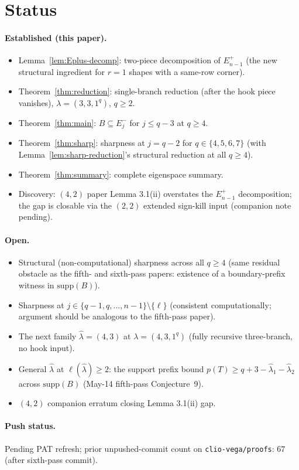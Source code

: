 \documentclass[11pt]{article}
\theoremstyle{definition}
\newcommand{\hatl}{\widehat\lambda}
\newcommand{\supp}{\mathrm{supp}}
\begin{document}
\section{Status}\label{sec:status}

\paragraph{Established (this paper).}
\begin{itemize}[topsep=0.3em,itemsep=0.1em]
\item Lemma~\ref{lem:Eplus-decomp}: two-piece decomposition of
   $E_{n-1}^+$ (the new structural ingredient for $r = 1$ shapes
   with a same-row corner).
\item Theorem~\ref{thm:reduction}: single-branch reduction (after the
   hook piece vanishes), $\lambda = (3, 3, 1^q)$, $q \ge 2$.
\item Theorem~\ref{thm:main}: $B \subseteq E_j^-$ for $j \le q - 3$
   at $q \ge 4$.
\item Theorem~\ref{thm:sharp}: sharpness at $j = q - 2$ for $q \in
   \{4, 5, 6, 7\}$ (with Lemma~\ref{lem:sharp-reduction}'s structural
   reduction at all $q \ge 4$).
\item Theorem~\ref{thm:summary}: complete eigenspace summary.
\item Discovery: $(4, 2)$ paper Lemma 3.1(ii) overstates the
   $E_{n-1}^+$ decomposition; the gap is closable via the $(2, 2)$
   extended sign-kill input (companion note pending).
\end{itemize}

\paragraph{Open.}
\begin{itemize}[topsep=0.3em,itemsep=0.1em]
\item Structural (non-computational) sharpness across all $q \ge 4$
   (same residual obstacle as the fifth- and sixth-pass papers:
   existence of a boundary-prefix witness in $\supp(B)$).
\item Sharpness at $j \in \{q-1, q, \ldots, n-1\} \setminus \{\ell\}$
   (consistent computationally; argument should be analogous to the
   fifth-pass paper).
\item The next family $\hatl = (4, 3)$ at $\lambda = (4, 3, 1^q)$
   (fully recursive three-branch, no hook input).
\item General $\hatl$ at $\ell(\hatl) \ge 2$: the support prefix bound
   $p(T) \ge q + 3 - \hatl_1 - \hatl_2$ across $\supp(B)$
   (May-14 fifth-pass Conjecture~9).
\item $(4, 2)$ companion erratum closing Lemma 3.1(ii) gap.
\end{itemize}

\paragraph{Push status.}
Pending PAT refresh; prior unpushed-commit count on
\texttt{clio-vega/proofs}: $67$ (after sixth-pass commit).
\end{document}
